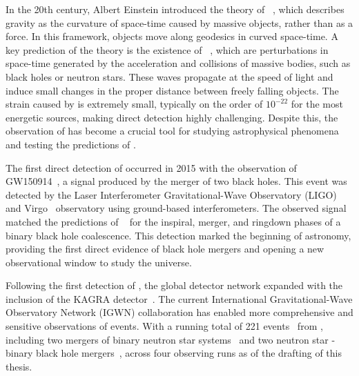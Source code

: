 In the 20th century, Albert Einstein introduced the theory of \GR~\cite{Einstein_1:1914, Einstein_2:1914, Einstein_3:1914, Einstein_4:1915, Einstein_5:1916, Einstein_6:1917, Einstein_7:1936}, which describes gravity as the curvature of space-time caused by massive objects, rather than as a force. In this framework, objects move along geodesics in curved space-time. A key prediction of the theory is the existence of \gws~\cite{Einstein_8:1937, Einstein_9:1938, Einstein_10:1939, Einstein_11:1948}, which are perturbations in space-time generated by the acceleration and collisions of massive bodies, such as black holes or neutron stars. These waves propagate at the speed of light and induce small changes in the proper distance between freely falling objects. The strain caused by \gws is extremely small, typically on the order of $10^{-22}$ for the most energetic sources, making direct detection highly challenging. Despite this, the observation of \gws has become a crucial tool for studying astrophysical phenomena and testing the predictions of \GR.



The first direct detection of \gws occurred in 2015 with the observation of GW150914~\cite{GW150914:2016}, a \gwadj signal produced by the merger of two black holes. This event was detected by the Laser Interferometer Gravitational-Wave Observatory (LIGO) and Virgo~\cite{aVirgo:2015} \gwadj observatory using ground-based interferometers. The observed signal matched the predictions of \GR~\cite{GW150914_TGR:2016} for the inspiral, merger, and ringdown phases of a binary black hole coalescence. This detection marked the beginning of \gwadj astronomy, providing the first direct evidence of black hole mergers and opening a new observational window to study the universe.



Following the first detection of \gws, the global \gwadj detector network expanded with the inclusion of the KAGRA detector~\cite{KAGRA:2021}. The current International Gravitational-Wave Observatory Network (IGWN) collaboration has enabled more comprehensive and sensitive observations of \gwadj events. With a running total of 221 \gwadj events~\cite{gwtc1:2019, gwtc2:2021, gwtc21:2024, gwtc3:2023, 1OGC:2018, 2OGC:2020, 3OGC:2021, 4OGC:2021, Princeton_1:2019, Princeton_2:2019, Princeton_3a:2022, Princeton_3b:2023, gracedb_superevents:2024} from \cbcs, including two mergers of binary neutron star systems~\cite{GW170817:2017, GW190425:2020} and two neutron star - binary black hole mergers~\cite{nsbh:2021}, across four observing runs as of the drafting of this thesis.

